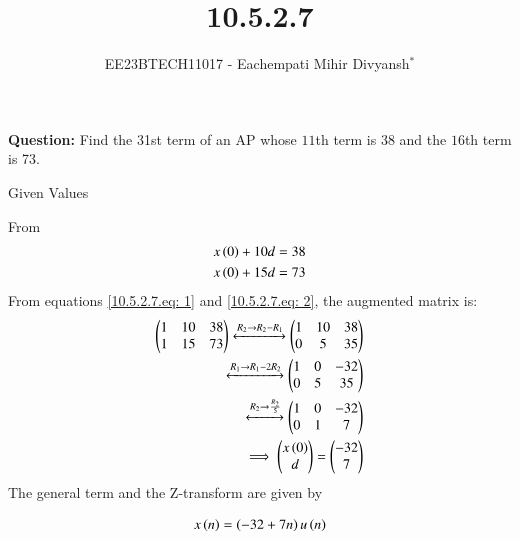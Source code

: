\documentclass[journal,12pt,twocolumn]{IEEEtran}
\theoremstyle{remark}
\begin{document}

\vspace{3cm}

\title{10.5.2.7}
\author{EE23BTECH11017 - Eachempati Mihir Divyansh$^{*}$%
}
\maketitle
\newpage
\bigskip

\renewcommand{\thefigure}{\theenumi}
\renewcommand{\thetable}{\theenumi}

\textbf{Question:} Find the 31st term of an AP whose $11$th term is 38 and the $16$th term is 73.
\\
\solution
\begin{table}[h]
    \centering
    
    \caption{Given Values}
    \label{tab:1}
\end{table}
From  
\begin{align}
x\left(0\right)+10d&=38\label{10.5.2.7.eq: 1}\\
x\left(0\right)+15d&=73 \label{10.5.2.7.eq: 2}
\end{align}
From  equations \ref{10.5.2.7.eq: 1} and \ref{10.5.2.7.eq: 2}, the augmented matrix is:
\begin{align}
 \begin{pmatrix}
   1 & 10 & 38
   \\
   1 & 15 & 73
 \end{pmatrix} 
 \xleftrightarrow[]{R_2 \rightarrow R_2-R_1} 
  \begin{pmatrix}
   1 & 10 & 38
   \\
   0 & 5 & 35
 \end{pmatrix} \\
 \xleftrightarrow[]{R_1 \rightarrow R_1-2R_2} 
  \begin{pmatrix}
   1 & 0 & -32
   \\
   0 & 5 & 35
 \end{pmatrix} \\
  \xleftrightarrow[]{R_2 \rightarrow \frac{R_2}{5}} 
  \begin{pmatrix}
   1 & 0 & -32
   \\
   0 & 1 & 7
 \end{pmatrix} \\
 \implies \begin{pmatrix}
   x\left(0\right)
   \\
   d
 \end{pmatrix}
 =
 \begin{pmatrix}
   -32
   \\
   7
 \end{pmatrix}
 \end{align}
 The general term and the Z-transform are given by

 \begin{align}
    x\left(n\right)&=\left(-32+7n\right)u\left(n\right)\\ 
 \end{align}
\end{document}
